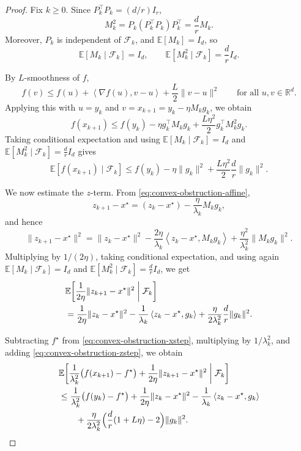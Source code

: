 \documentclass[10pt]{article}
\newcommand{\E}{\mathbb{E}}
\newcommand{\F}{\mathcal{F}}
\newcommand{\R}{\mathbb{R}}
\newcommand{\ip}[2]{\left\langle #1,#2\right\rangle}
\begin{document}
\begin{proof}
Fix \(k\ge0\).
Since \(P_k^\top P_k=(d/r)I_r\),
\[
M_k^2
=
P_k(P_k^\top P_k)P_k^\top
=
\frac{d}{r}M_k.
\]
Moreover, \(P_k\) is independent of \(\F_k\), and \(\E[M_k]=I_d\), so
\[
\E[M_k\mid\F_k]=I_d,
\qquad
\E[M_k^2\mid\F_k]
=
\frac{d}{r}I_d.
\label{eq:convex-obstruction-M2-proof}
\]

By \(L\)-smoothness of \(f\),
\[
f(v)\le f(u)+\ip{\nabla f(u)}{v-u}+\frac{L}{2}\|v-u\|^2
\qquad
\text{for all }u,v\in\R^d.
\]
Applying this with \(u=y_k\) and \(v=x_{k+1}=y_k-\eta M_k g_k\), we obtain
\[
f(x_{k+1})
\le
f(y_k)-\eta g_k^\top M_k g_k+\frac{L\eta^2}{2}g_k^\top M_k^2 g_k.
\]
Taking conditional expectation and using \(\E[M_k\mid\F_k]=I_d\) and
\(\E[M_k^2\mid\F_k]=\frac{d}{r}I_d\) gives
\begin{equation}
\E[f(x_{k+1})\mid\F_k]
\le
f(y_k)-\eta\|g_k\|^2+\frac{L\eta^2}{2}\frac{d}{r}\|g_k\|^2.
\label{eq:convex-obstruction-xstep}
\end{equation}


We now estimate the \(z\)-term. From \eqref{eq:convex-obstruction-affine},
\[
z_{k+1}-x^\star
=
(z_k-x^\star)-\frac{\eta}{\lambda_k}M_k g_k,
\]
and hence
\[
\|z_{k+1}-x^\star\|^2
=
\|z_k-x^\star\|^2
-\frac{2\eta}{\lambda_k}\ip{z_k-x^\star}{M_k g_k}
+\frac{\eta^2}{\lambda_k^2}\|M_k g_k\|^2.
\]
Multiplying by \(1/(2\eta)\), taking conditional expectation, and using again
\(\E[M_k\mid\F_k]=I_d\) and \(\E[M_k^2\mid\F_k]=\frac{d}{r}I_d\), we get
\begin{align}
&\E\!\left[
\frac{1}{2\eta}\|z_{k+1}-x^\star\|^2
\;\middle|\;\F_k
\right]
\notag\\
&=
\frac{1}{2\eta}\|z_k-x^\star\|^2
-\frac{1}{\lambda_k}\ip{z_k-x^\star}{g_k}
+\frac{\eta}{2\lambda_k^2}\frac{d}{r}\|g_k\|^2.
\label{eq:convex-obstruction-zstep}
\end{align}

Subtracting \(f^\star\) from \eqref{eq:convex-obstruction-xstep}, multiplying by \(1/\lambda_k^2\), and adding \eqref{eq:convex-obstruction-zstep}, we obtain
\begin{align}
&\E\!\left[
\frac{1}{\lambda_k^2}\bigl(f(x_{k+1})-f^\star\bigr)
+\frac{1}{2\eta}\|z_{k+1}-x^\star\|^2
\;\middle|\;\F_k
\right]
\notag\\
&\le
\frac{1}{\lambda_k^2}\bigl(f(y_k)-f^\star\bigr)
+\frac{1}{2\eta}\|z_k-x^\star\|^2
-\frac{1}{\lambda_k}\ip{z_k-x^\star}{g_k}
\notag\\
&\qquad
+\frac{\eta}{2\lambda_k^2}
\Bigl(
\frac{d}{r}(1+L\eta)-2
\Bigr)\|g_k\|^2.
\label{eq:convex-obstruction-before-convexity}
\end{align}


\end{proof}
\end{document}
